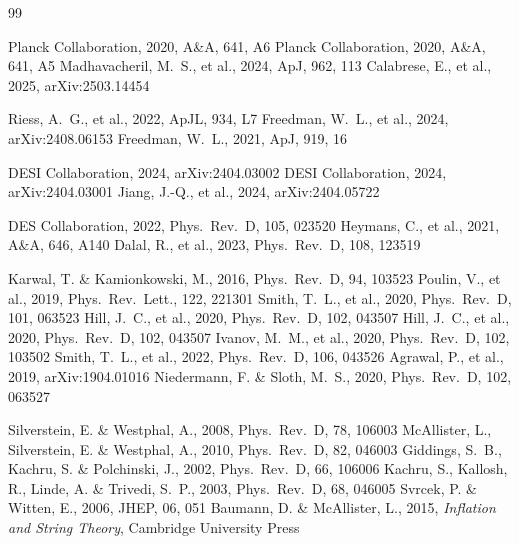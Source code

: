 \documentclass[a4paper,11pt]{article}
\begin{document}
\begin{thebibliography}{99}

 Planck Collaboration, 2020, A\&A, 641, A6
 Planck Collaboration, 2020, A\&A, 641, A5
 Madhavacheril, M.~S., et al., 2024, ApJ, 962, 113
 Calabrese, E., et al., 2025, arXiv:2503.14454

 Riess, A.~G., et al., 2022, ApJL, 934, L7
 Freedman, W.~L., et al., 2024, arXiv:2408.06153
 Freedman, W.~L., 2021, ApJ, 919, 16

 DESI Collaboration, 2024, arXiv:2404.03002
 DESI Collaboration, 2024, arXiv:2404.03001
 Jiang, J.-Q., et al., 2024, arXiv:2404.05722

 DES Collaboration, 2022, Phys.\ Rev.\ D, 105, 023520
 Heymans, C., et al., 2021, A\&A, 646, A140
 Dalal, R., et al., 2023, Phys.\ Rev.\ D, 108, 123519

 Karwal, T. \& Kamionkowski, M., 2016, Phys.\ Rev.\ D, 94, 103523
 Poulin, V., et al., 2019, Phys.\ Rev.\ Lett., 122, 221301
 Smith, T.~L., et al., 2020, Phys.\ Rev.\ D, 101, 063523
 Hill, J.~C., et al., 2020, Phys.\ Rev.\ D, 102, 043507
 Hill, J.~C., et al., 2020, Phys.\ Rev.\ D, 102, 043507
 Ivanov, M.~M., et al., 2020, Phys.\ Rev.\ D, 102, 103502
 Smith, T.~L., et al., 2022, Phys.\ Rev.\ D, 106, 043526
 Agrawal, P., et al., 2019, arXiv:1904.01016
 Niedermann, F. \& Sloth, M.~S., 2020, Phys.\ Rev.\ D, 102, 063527

 Silverstein, E. \& Westphal, A., 2008, Phys.\ Rev.\ D, 78, 106003
 McAllister, L., Silverstein, E. \& Westphal, A., 2010, Phys.\ Rev.\ D, 82, 046003
 Giddings, S.~B., Kachru, S. \& Polchinski, J., 2002, Phys.\ Rev.\ D, 66, 106006
 Kachru, S., Kallosh, R., Linde, A. \& Trivedi, S.~P., 2003, Phys.\ Rev.\ D, 68, 046005
 Svrcek, P. \& Witten, E., 2006, JHEP, 06, 051
 Baumann, D. \& McAllister, L., 2015, \textit{Inflation and String Theory}, Cambridge University Press


\end{thebibliography}
\end{document}

